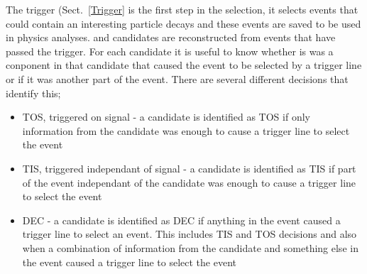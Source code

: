 

The trigger (Sect.~\ref{Trigger} is the first step in the selection, it selects events that could contain an interesting particle decays and these events are saved to be used in physics analyses. \bsmumu and \bhh candidates are reconstructed from events that have passed the trigger. For each candidate it is useful to know whether is was a conponent in that candidate that caused the event to be selected by a trigger line or if it was another part of the event. There are several different decisions that identify this;
\begin{itemize}
\item TOS, triggered on signal - a candidate is identified as TOS if only information from the candidate was enough to cause a trigger line to select the event
\item TIS, triggered independant of signal - a candidate is identified as TIS if part of the event independant of the candidate was enough to cause a trigger line to select the event
\item DEC - a candidate is identified as DEC if anything in the event caused a trigger line to select an event. This includes TIS and TOS decisions and also when a combination of information from the candidate and something else in the event caused a trigger line to select the event
\end{itemize}

